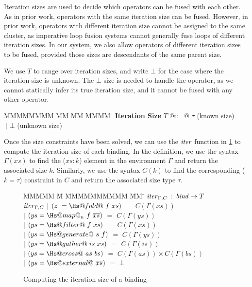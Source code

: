Iteration sizes are used to decide which operators can be fused with each other.
As in prior work, operators with the same iteration size can be fused.
However, in prior work, operators with different iteration size cannot be assigned to the same cluster, as imperative loop fusion systems cannot generally fuse loops of different iteration sizes.
In our system, we also allow operators of different iteration sizes to be fused, provided those sizes are descendants of the same parent size.

We use $T$ to range over iteration sizes, and write $\bot$ for the case where the iteration size is unknown. The $\bot$ size is needed to handle the \Hs@external@ operator, as we cannot statically infer its true iteration size, and it cannot be fused with any other operator.

\begin{tabbing}
MMMMMMMM \= MM       \= MM \= MMMM \= \kill
\textbf{Iteration Size}
 \> $T$         \> @::=@  \> $\tau$        \> (known size) \\
 \>             \> $~|$   \> $\bot$     \> (unknown size) \\
\end{tabbing}

Once the size constraints have been solved, we can use the $\mathit{iter}$ function in \cref{fig:clustering:iter} to compute the iteration size of each binding.
In the definition, we use the syntax $\Gamma(xs)$ to find the ($xs : k$) element in the environment $\Gamma$ and return the associated size $k$.
Similarly, we use the syntax $C(k)$ to find the corresponding ($k = \tau$) constraint in $C$ and return the associated size type $\tau$.


\begin{figure}
\begin{tabbing}
MMMMM \= M \= MMMMMMMMMM \= MM \= \kill
$\mathit{iter}_{\Gamma,C}$  
        \>$:$\> $\mathit{bind} \rightarrow T$ 
\\[1ex]
$\mathit{iter}_{\Gamma,C}$
        \> $|$  \> $(z~ = \Hs@fold@~ f~xs)$     
                \> $=$ \> $C(\Gamma(xs))$ 
\\
        \> $|$  \> $(ys = \Hs@map@_n~f~\overline{xs})$
                \> $=$ \> $C(\Gamma(ys))$ 
\\
        \> $|$  \> $(ys = \Hs@filter@~f~xs)$    
                \> $=$ \> $C(\Gamma(xs))$ 
\\
        \> $|$  \> $(ys = \Hs@generate@~s~f)$  
                \> $=$ \> $C(\Gamma(ys))$ 
\\
        \> $|$  \> $(ys = \Hs@gather@~is~xs)$    
                \> $=$ \> $C(\Gamma(is))$ 
\\
        \> $|$  \> $(ys = \Hs@cross@~as~bs)$     
                \> $=$ \> $C(\Gamma(as)) \times C(\Gamma(bs))$ 
\\
        \> $|$  \> $(ys = \Hs@external@~\overline{xs})$  
                \> $=$ \> $\bot$ 
\end{tabbing}
\caption{Computing the iteration size of a binding}
\label{fig:clustering:iter}
\end{figure}


